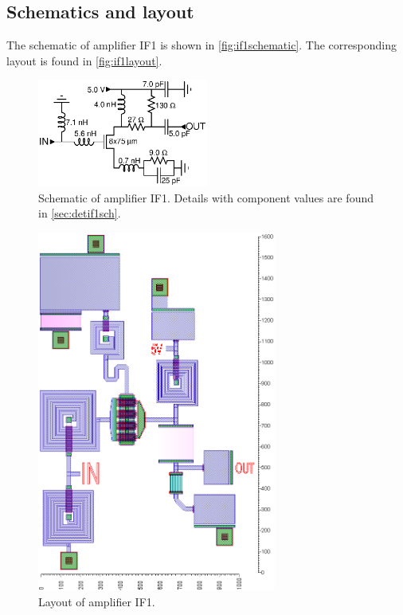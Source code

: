 		\subsection{Schematics and layout}
			The schematic of amplifier IF1 is shown in \autoref{fig:if1schematic}. The corresponding layout is found in \autoref{fig:if1layout}.

			\begin{figure}[hbt!]
				\centering
				\includegraphics[width=0.5\textwidth]{fig/amplifiers/if1/sch_if1}
				\caption[Amplifier IF1 schematic.]{Schematic of amplifier IF1. Details with component values are found in \autoref{sec:detif1sch}.}\label{fig:if1schematic}
			\end{figure}

			\begin{figure}[hbt!]
				\centering
				\includegraphics[width=0.7\textwidth]{fig/amplifiers/if1/layout}
				\caption[Amplifier IF1 layout.]{Layout of amplifier IF1.\scalemum}\label{fig:if1layout}
			\end{figure}

